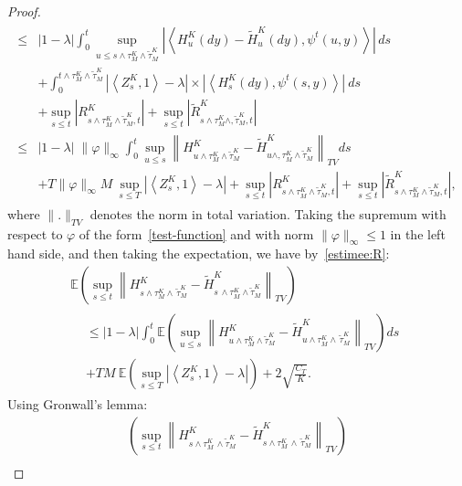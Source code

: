 \documentclass[10pt]{amsart}
\theoremstyle{definition}\newtheorem{defi}[theo]{Definition}\newtheorem{rema}[theo]{Remark}\newtheorem{exam}[theo]{Example}\newtheorem{exem}[theo]{Example}\newtheorem{nota}[theo]{Notation}
\newcommand*\E{\mathbb{E}}
\begin{document}
\begin{proof}
\begin{multline*}
\begin{aligned}
\leq & |1-\lambda| \int_0^t \sup_{u \leq s \wedge \tau^K_M \wedge \widetilde{\tau}^K_M} \left|\left\langle H^K_{u}(dy) - \widetilde{H}^K_{u}(dy),\psi^t(u,y)\right\rangle \right| \, ds \\
& + \int_0^{t \wedge \tau^K_M \wedge \widetilde{\tau}^K_M} \left|\left\langle Z^K_s,1\right\rangle- \lambda \right|\times \left|\left\langle H^K_s(dy),\psi^t(s,y)\right\rangle\right| \ ds\\
& + \sup_{s \leq t} \left| R_{s \wedge \tau^K_M \wedge \widetilde{\tau}^K_M, t}^{K} \right| + \sup_{s \leq t}\left|\widetilde{R}_{s \wedge \tau^K_M \wedge ,\widetilde{\tau}^K_M, t}^K\right|\\
\leq & |1-\lambda|\; \|\varphi\|_\infty \int_0^t \sup_{u \leq s} \left\| H^K_{u \wedge \tau^K_M \wedge\widetilde{\tau}^K_M} - \widetilde{H}^K_{u \wedge ,\tau^K_M \wedge \widetilde{\tau}^K_M}\right\|_{TV} ds \\
& + T\|\varphi\|_\infty M \ \sup_{s \leq T} \left|\left\langle Z^K_s,1\right\rangle- \lambda \right| + \sup_{s \leq t} \left| R_{s \wedge \tau^K_M \wedge  \widetilde{\tau}^K_M, t}^{K} \right| + \sup_{s \leq t}\left|\widetilde{R}_{s \wedge \tau^K_M \wedge  \widetilde{\tau}^K_M, t}^K\right|,
\end{aligned}
\end{multline*}
\endgroup
where $\|.\|_{TV}$ denotes the norm in total variation. Taking the supremum with respect to $\varphi$ of the form~\eqref{test-function} and with norm $\|\varphi\|_\infty\leq 1$ in the left hand side, and then taking the expectation, we have by~\eqref{estimee:R}:
\begingroup
\allowdisplaybreaks
\begin{multline*}
\E\left(\sup_{s \leq t} \left\|H^K_{s \wedge  \tau^K_M \wedge\,\widetilde{\tau}^K_M}-\widetilde{H}^K_{s\,\wedge \tau^K_M \wedge \widetilde{\tau}^K_M} \right\|_{TV}\right)\\
\begin{aligned}
&\leq |1-\lambda| \int_0^t \E\left(\sup_{u \leq s} \left\|H^K_{u \wedge \tau^K_M \wedge \widetilde{\tau}^K_M}- \widetilde{H}^K_{u \wedge \tau^K_M \wedge\,\widetilde{\tau}^K_M}\right\|_{TV} \right) ds \\
&+ TM \ \E\left(\sup_{s \leq T} \left|\left\langle Z^K_s,1\right\rangle- \lambda \right|\right)+ 2 \sqrt{\frac{C_T }{K}}.
\end{aligned}
\end{multline*}
\endgroup
Using Gronwall's lemma:
\begingroup
\allowdisplaybreaks
\begin{multline*}
\left(\sup_{s \leq t} \left\|H^K_{s \wedge \tau^K_M\,\wedge \widetilde{\tau}^K_M}-\widetilde{H}^K_{s \wedge \tau^K_M\,\wedge\,\widetilde{\tau}^K_M} \right\|_{TV}\right)\\

\end{multline*}
\end{proof}
\end{document}
